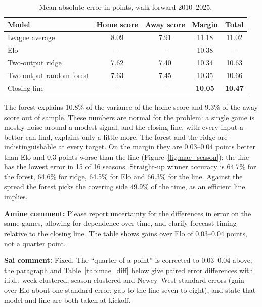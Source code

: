 \begin{table}[H]
\centering
\small
\begin{tabular}{lcccc}
\toprule
\textbf{Model} & \textbf{Home score} & \textbf{Away score} & \textbf{Margin} & \textbf{Total} \\
\midrule
League average & 8.09 & 7.91 & 11.18 & 11.02 \\
Elo & -- & -- & 10.38 & -- \\
Two-output ridge & 7.62 & 7.40 & 10.34 & 10.63 \\
Two-output random forest & 7.63 & 7.45 & 10.35 & 10.66 \\
Closing line & -- & -- & \textbf{10.05} & \textbf{10.47} \\
\bottomrule
\end{tabular}
\caption{Mean absolute error in points, walk-forward 2010--2025.}
\label{tab:mae}
\end{table}

The forest explains 10.8\% of the variance of the home score and 9.3\% of the away score out of sample. These numbers are normal for the problem: a single game is mostly noise around a modest signal, and the closing line, with every input a bettor can find, explains only a little more. The forest and the ridge are indistinguishable at every target. On the margin they are 0.03--0.04 points better than Elo and 0.3 points worse than the line (Figure~\ref{fig:mae_season}); the line has the lowest error in 15 of 16 seasons. Straight-up winner accuracy is 64.7\% for the forest, 64.6\% for ridge, 64.5\% for Elo and 66.3\% for the line. Against the spread the forest picks the covering side 49.9\% of the time, as an efficient line implies.

{\color{red}\textbf{Amine comment:} Please report uncertainty for the differences in error on the same games, allowing for dependence over time, and clarify forecast timing relative to the closing line. The table shows gains over Elo of 0.03--0.04 points, not a quarter point.}

{\color{blue}\textbf{Sai comment:} Fixed. The ``quarter of a point'' is corrected to 0.03--0.04 above; the paragraph and Table~\ref{tab:mae_diff} below give paired error differences with i.i.d., week-clustered, season-clustered and Newey--West standard errors (gain over Elo about one standard error; gap to the line seven to eight), and state that model and line are both taken at kickoff.}

